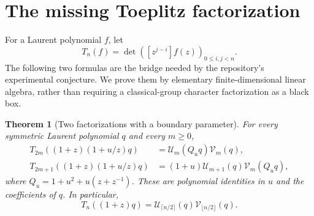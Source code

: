 \documentclass[11pt]{article}
\newtheorem{theorem}{Theorem}[section]
\theoremstyle{definition}
\theoremstyle{remark}
\newcommand{\UU}{\mathcal U}
\newcommand{\VV}{\mathcal V}
\theoremstyle{definition}
\theoremstyle{plain}
\numberwithin{equation}{section}
\begin{document}
\section{The missing Toeplitz factorization}
\label{rs:sec:toeplitz}
For a Laurent polynomial $f$, let
\begin{equation}
 T_n(f)=\det([z^{j-i}]f(z))_{0\le i,j<n}.
 \label{rs:eq:T}
\end{equation}
The following two formulas are the bridge needed by the repository's
experimental conjecture. We prove them by elementary finite-dimensional
linear algebra, rather than requiring a classical-group character
factorization as a black box.

\begin{theorem}[Two factorizations with a boundary parameter]
\label{rs:thm:Toeplitz}
For every symmetric Laurent polynomial $q$ and every $m\ge0$,
\begin{align}
 T_{2m}((1+z)(1+u/z)q)&=\UU_m(Q_uq)\VV_m(q),\label{rs:eq:Toeplitz-even}\\
 T_{2m+1}((1+z)(1+u/z)q)&=(1+u)\UU_{m+1}(q)\VV_m(Q_uq),
 \label{rs:eq:Toeplitz-odd}
\end{align}
where $Q_u=1+u^2+u(z+z^{-1})$. These are polynomial identities in $u$
and the coefficients of $q$. In particular,
\begin{equation}
 T_n((1+z)q)=\UU_{\lceil n/2\rceil}(q)\VV_{\lfloor n/2\rfloor}(q).
 \label{rs:eq:Toeplitz-zero}
\end{equation}
\end{theorem}
\end{document}
